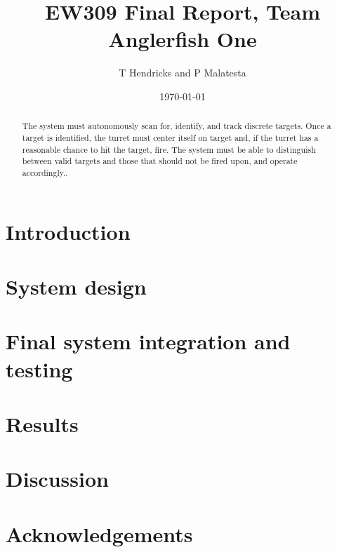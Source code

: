 \documentclass{article}
\title{EW309 Final Report, Team Anglerfish One}
\author{T Hendricks and P Malatesta}
\date{\today}
\begin{document}
\maketitle

\begin{abstract}
The system must autonomously scan for, identify, and track discrete targets. Once a target is identified, the turret must center itself on target and, if the turret has a reasonable chance to hit the target, fire. The system must be able to distinguish between valid targets and those that should not be fired upon, and operate accordingly..
\end{abstract}

\section{Introduction}


\section{System design}






\section{Final system integration and testing}
\section{Results}
\section{Discussion}
\section{Acknowledgements}

%

\appendix

\end{document}
